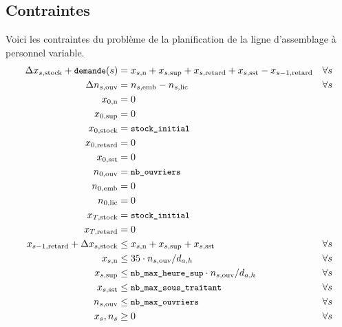 \subsection*{Contraintes}
Voici les contraintes du problème de la planification
de la ligne d’assemblage à personnel variable.
\begin{align*}
  \Delta x_{s,\text{stock}} + {\small\texttt{demande}}(s) &= x_{s,\text{n}} + x_{s,\text{sup}}
  + x_{s,\text{retard}} + x_{s,\text{sst}} - x_{s-1,\text{retard}} &\forall s \\
  \Delta n_{s,\text{ouv}} &= n_{s,\text{emb}} - n_{s,\text{lic}} &\forall s \\
  x_{0,\text{n}}&= 0 \\
  x_{0,\text{sup}}&= 0 \\
  x_{0,\text{stock}}&= {\small\texttt{stock\_initial}} \\
  x_{0,\text{retard}}&= 0 \\
  x_{0,\text{sst}}&= 0 \\
  n_{0,\text{ouv}}&= {\small\texttt{nb\_ouvriers}} \\
  n_{0,\text{emb}}&= 0 \\
  n_{0,\text{lic}}&= 0 \\
  x_{T,\text{stock}}&= {\small\texttt{stock\_initial}} \\
  x_{T,\text{retard}}&= 0 \\
  x_{s-1,\text{retard}} + \Delta x_{s,\text{stock}} &\leq x_{s,\text{n}} + x_{s,\text{sup}} + x_{s,\text{sst}} &\forall s \\
  x_{s,\text{n}} &\leq 35\cdot n_{s,\text{ouv}} / d_{a,h}
  &\forall s \\
  x_{s,\text{sup}} &\leq {\small\texttt{nb\_max\_heure\_sup}}\cdot n_{s,\text{ouv}} / d_{a,h}
  &\forall s \\
  x_{s,\text{sst}} &\leq {\small\texttt{nb\_max\_sous\_traitant}} &\forall s \\
  n_{s,\text{ouv}} &\leq {\small\texttt{nb\_max\_ouvriers}}  &\forall s \\
  x_s, n_s&\geq 0 &\forall s
\end{align*}
